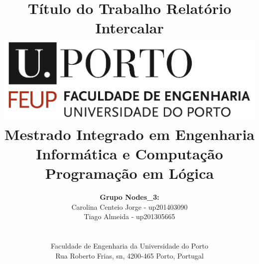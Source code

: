 \documentclass[a4paper]{article}
\begin{document}
\renewcommand{\figurename}{Fig.}

\setlength{\textwidth}{16cm}
\setlength{\textheight}{22cm}

\title{\Huge\textbf{Título do Trabalho}\linebreak\linebreak\linebreak
\Large\textbf{Relatório Intercalar}\linebreak\linebreak
\linebreak\linebreak
\includegraphics[scale=0.1]{feup-logo.png}\linebreak\linebreak
\linebreak\linebreak
\Large{Mestrado Integrado em Engenharia Informática e Computação} \linebreak\linebreak
\Large{Programação em Lógica}\linebreak
}

\author{\textbf{Grupo Nodes\_3:}\\
Carolina Centeio Jorge - up201403090 \\
Tiago Almeida - up201305665 \\
\linebreak\linebreak \\
 \\ Faculdade de Engenharia da Universidade do Porto \\ Rua Roberto Frias, s\/n, 4200-465 Porto, Portugal \linebreak\linebreak\linebreak
\linebreak\linebreak\vspace{1cm}}

\maketitle
\thispagestyle{empty}
\end{document}
